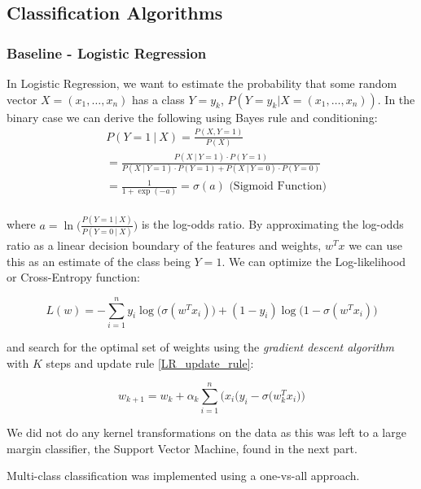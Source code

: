 \documentclass[conference]{IEEEtran}
\begin{document}
\subsection{Classification Algorithms}

\subsubsection{Baseline - Logistic Regression}
In Logistic Regression, we want to estimate the probability that some random vector $X=(x_1, \ldots, x_n)$ has a class $Y=y_k$, $P(Y=y_k | X=(x_1, \ldots, x_n))$. In the binary case we can derive the following using Bayes rule and conditioning:
\begin{equation*}
\begin{split}
&P(Y=1~|~X) = \frac{P(X, Y=1)}{P(X)}\\
&= \frac{ P(X~|~Y=1)\cdot P(Y=1) }{ P(X~|~Y=1)\cdot P(Y=1) + P(X~|~Y=0)\cdot P(Y=0) }\\
& = \frac{1}{1 + \exp{(-a)}} = \sigma(a) \text{~(Sigmoid Function)}\\
\end{split}
\end{equation*}

where $a=\ln\Big(\frac{P(Y=1~|~X)}{P(Y=0~|~X)}\Big)$ is the log-odds ratio. By approximating the log-odds ratio as a linear decision boundary of the features and weights, $w^T x$ we can use this as an estimate of the class being $Y=1$. We can optimize the Log-likelihood or Cross-Entropy function:

\begin{equation}
	\label{LL}
	L(w) = -\sum_{i=1}^n y_i\log\Big(\sigma(w^Tx_i)\Big) + (1-y_i)\log\Big(1-\sigma(w^Tx_i)\Big)
\end{equation}

and search for the optimal set of weights using the \emph{gradient descent algorithm} with $K$ steps and update rule \ref{LR_update_rule}:

\begin{equation}
\label{LR_update_rule}
	w_{k+1} = w_k + \alpha_k \sum_{i=1}^n \Big( x_i\big(y_i - \sigma(w_k^Tx_i\big) \Big)
\end{equation}

We did not do any kernel transformations on the data as this was left to a large margin classifier, the Support Vector Machine,  found in the next part.

Multi-class classification was implemented using a one-vs-all approach.
\end{document}
